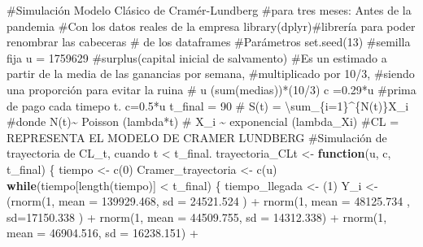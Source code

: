 \documentclass[
  us-letterpaper,
]{scrreprt}
\newenvironment{Shaded}{\begin{snugshade}}{\end{snugshade}}
\newcommand{\AttributeTok}[1]{\textcolor[rgb]{0.40,0.45,0.13}{#1}}
\newcommand{\CommentTok}[1]{\textcolor[rgb]{0.37,0.37,0.37}{#1}}
\newcommand{\ControlFlowTok}[1]{\textcolor[rgb]{0.00,0.23,0.31}{\textbf{#1}}}
\newcommand{\DecValTok}[1]{\textcolor[rgb]{0.68,0.00,0.00}{#1}}
\newcommand{\FloatTok}[1]{\textcolor[rgb]{0.68,0.00,0.00}{#1}}
\newcommand{\FunctionTok}[1]{\textcolor[rgb]{0.28,0.35,0.67}{#1}}
\newcommand{\NormalTok}[1]{\textcolor[rgb]{0.00,0.23,0.31}{#1}}
\newcommand{\OtherTok}[1]{\textcolor[rgb]{0.00,0.23,0.31}{#1}}
\newcommand{\SpecialCharTok}[1]{\textcolor[rgb]{0.37,0.37,0.37}{#1}}
\theoremstyle{definition}
\theoremstyle{plain}
\theoremstyle{plain}
\theoremstyle{remark}
\begin{document}
\begin{Shaded}
\begin{Highlighting}[]
\CommentTok{\#Simulación Modelo Clásico de Cramér{-}Lundberg }
\CommentTok{\#para tres meses: Antes de la pandemia}
\CommentTok{\#Con los datos reales de la empresa}
\FunctionTok{library}\NormalTok{(dplyr)}\CommentTok{\#librería para poder renombrar las cabeceras }
\CommentTok{\# de los dataframes}
\CommentTok{\#Parámetros}
\FunctionTok{set.seed}\NormalTok{(}\DecValTok{13}\NormalTok{) }\CommentTok{\#semilla fija}
\NormalTok{u }\OtherTok{=} \DecValTok{1759629} \CommentTok{\#surplus(capital inicial de salvamento)}
\CommentTok{\#Es un estimado a partir de la media de las ganancias por semana, }
\CommentTok{\#multiplicado por 10/3, }
\CommentTok{\#siendo una proporción para evitar la ruina}
\CommentTok{\# u (sum(medias))*(10/3)}
\NormalTok{c }\OtherTok{=}\FloatTok{0.29}\SpecialCharTok{*}\NormalTok{u }\CommentTok{\#prima de pago cada timepo t. c=0.5*u}
\NormalTok{t\_final }\OtherTok{=} \DecValTok{90}
\CommentTok{\# S(t) = \textbackslash{}sum\_\{i=1\}\^{}\{N(t)\}X\_i}
\CommentTok{\#donde N(t)\textasciitilde{} Poisson (lambda*t)}
\CommentTok{\# X\_i \textasciitilde{} exponencial (lambda\_Xi)}
\CommentTok{\#CL = REPRESENTA EL MODELO DE CRAMER LUNDBERG}
\CommentTok{\#Simulación de trayectoria de CL\_t, cuando t \textless{} t\_final.}
\NormalTok{trayectoria\_CLt }\OtherTok{\textless{}{-}} \ControlFlowTok{function}\NormalTok{(u, c, t\_final)}
\NormalTok{\{}
\NormalTok{  tiempo }\OtherTok{\textless{}{-}} \FunctionTok{c}\NormalTok{(}\DecValTok{0}\NormalTok{)}
\NormalTok{  Cramer\_trayectoria }\OtherTok{\textless{}{-}} \FunctionTok{c}\NormalTok{(u)}
  \ControlFlowTok{while}\NormalTok{(tiempo[}\FunctionTok{length}\NormalTok{(tiempo)] }\SpecialCharTok{\textless{}}\NormalTok{ t\_final)}
\NormalTok{  \{}
\NormalTok{    tiempo\_llegada }\OtherTok{\textless{}{-}}\NormalTok{ (}\DecValTok{1}\NormalTok{)}
\NormalTok{  Y\_i }\OtherTok{\textless{}{-}}\NormalTok{  (}\FunctionTok{rnorm}\NormalTok{(}\DecValTok{1}\NormalTok{, }\AttributeTok{mean =} \FloatTok{139929.468}\NormalTok{, }\AttributeTok{sd =} \FloatTok{24521.524}\NormalTok{ )  }\SpecialCharTok{+} 
            \FunctionTok{rnorm}\NormalTok{(}\DecValTok{1}\NormalTok{, }\AttributeTok{mean =} \FloatTok{48125.734}\NormalTok{ , }\AttributeTok{sd=}\FloatTok{17150.338}\NormalTok{ )   }\SpecialCharTok{+}  
            \FunctionTok{rnorm}\NormalTok{(}\DecValTok{1}\NormalTok{, }\AttributeTok{mean =}  \FloatTok{44509.755}\NormalTok{, }\AttributeTok{sd =} \FloatTok{14312.338}\NormalTok{)  }\SpecialCharTok{+} 
            \FunctionTok{rnorm}\NormalTok{(}\DecValTok{1}\NormalTok{, }\AttributeTok{mean =}   \FloatTok{46904.516}\NormalTok{, }\AttributeTok{sd =} \FloatTok{16238.151}\NormalTok{) }\SpecialCharTok{+} 

\end{Highlighting}
\end{Shaded}
\end{document}
